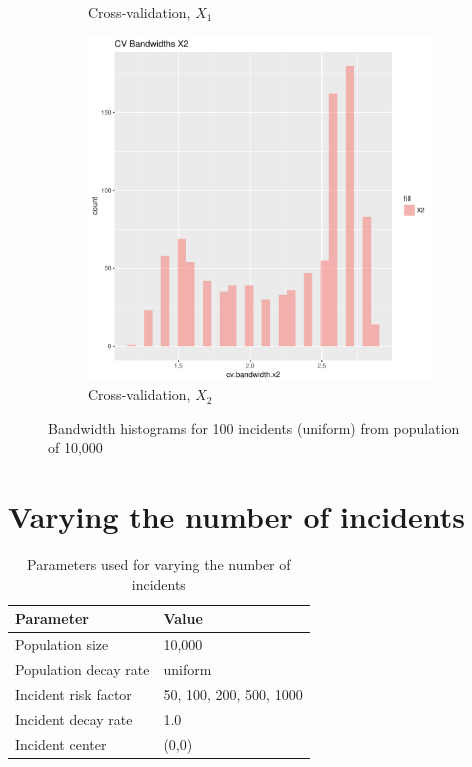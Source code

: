 \begin{figure}[htbp]
\begin{subfigure}[b]{0.3\textwidth}
    \caption{Cross-validation, \(X_1\)}
    \label{fig:bandwidths_x1:unif_100_unif:x1}
    \end{subfigure}
    \begin{subfigure}[b]{0.3\textwidth}
    \includegraphics[width=\textwidth]{results/unif_100_unif/output/bandwidths-x2}
    \caption{Cross-validation, \(X_2\)}
    \label{fig:bandwidths_x1:unif_100_unif:x2}
    \end{subfigure}
    \caption{Bandwidth histograms for 100 incidents (uniform) from population of 10,000}
\end{figure}


\section{Varying the number of incidents}
\label{sec:results:unif_NCases_1h}

\begin{table}[htbp]
\centering
\begin{tabular}{ll}
\hline
Parameter & Value \\
\hline
Population size & 10,000 \\
Population decay rate & uniform \\
Incident risk factor & 50, 100, 200, 500, 1000 \\
Incident decay rate & 1.0 \\
Incident center & (0,0) \\
\hline
\end{tabular}
\caption{Parameters used for varying the number of incidents}
\label{tab:params:unif_NCases_1h}
\end{table}


